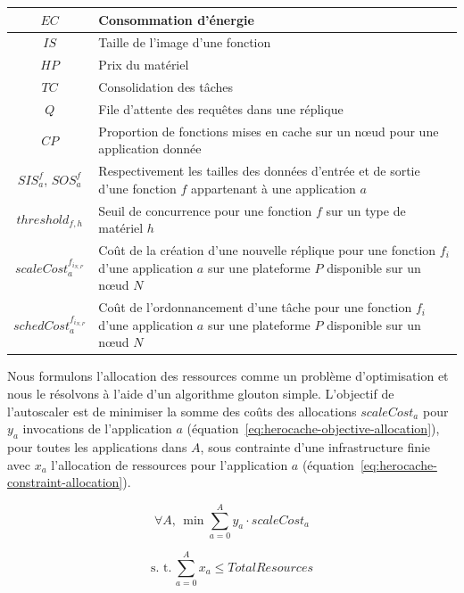 {\begin{table}[!ht]
\begin{center}
{\begin{tabularx}{\linewidth}{|c|Z|}
            $EC$ & Consommation d'énergie \\ \hline
            $IS$ & Taille de l'image d'une fonction \\ \hline
            $HP$ & Prix du matériel \\ \hline
            $TC$ & Consolidation des tâches \\ \hline
            $Q$ & File d'attente des requêtes dans une réplique \\ \hline
            $CP$ & Proportion de fonctions mises en cache sur un nœud pour une application donnée \\ \hline
            $SIS^{f}_{a}$, $SOS^{f}_{a}$ & Respectivement les tailles des données d'entrée et de sortie d'une fonction $f$ appartenant à une application $a$ \\ \hline
            $threshold_{f, h}$ & Seuil de concurrence pour une fonction $f$ sur un type de matériel $h$ \\ \hline
            $scaleCost^{{f}_{{i}_{N, P}}}_a$ & Coût de la création d'une nouvelle réplique pour une fonction $f_i$ d'une application $a$ sur une plateforme $P$ disponible sur un nœud $N$ \\ \hline
            $schedCost^{{f}_{{i}_{N, P}}}_a$ & Coût de l'ordonnancement d'une tâche pour une fonction $f_i$ d'une application $a$ sur une plateforme $P$ disponible sur un nœud $N$ \\ \hline
        \end{tabularx}
    }
    \label{table:herocache-notation}
    \end{center}
\end{table}

Nous formulons l'allocation des ressources comme un problème d'optimisation et nous le résolvons à l'aide d'un algorithme glouton simple. L'objectif de l'autoscaler est de minimiser la somme des coûts des allocations $scaleCost_{a}$ pour $y_a$ invocations de l'application $a$ (équation~\ref{eq:herocache-objective-allocation}), pour toutes les applications dans $A$, sous contrainte d'une infrastructure finie avec $x_a$ l'allocation de ressources pour l'application $a$ (équation~\ref{eq:herocache-constraint-allocation}).

\begin{equation}
    \forall A, \, \min \sum_{a = 0}^{A} y_a \cdot scaleCost_{a}
\label{eq:herocache-objective-allocation}
\end{equation}

\begin{equation}
    \text{s. t.} \, \sum_{a = 0}^{A} x_a \leq Total Resources
\label{eq:herocache-constraint-allocation}
\end{equation}

}
